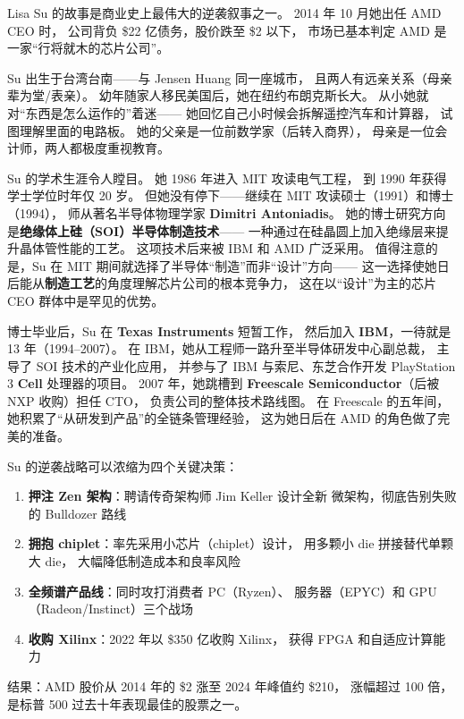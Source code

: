 Lisa Su 的故事是商业史上最伟大的逆袭叙事之一。
2014 年 10 月她出任 AMD CEO 时，
公司背负 \$22 亿债务，股价跌至 \$2 以下，
市场已基本判定 AMD 是一家``行将就木的芯片公司''。

Su 出生于台湾台南——与 Jensen Huang 同一座城市，
且两人有远亲关系（母亲辈为堂/表亲）。
幼年随家人移民美国后，她在纽约布朗克斯长大。
从小她就对``东西是怎么运作的''着迷——
她回忆自己小时候会拆解遥控汽车和计算器，
试图理解里面的电路板。
她的父亲是一位前数学家（后转入商界），
母亲是一位会计师，两人都极度重视教育。

\begin{corebox}
Su 的学术生涯令人瞠目。
她 1986 年进入 MIT 攻读电气工程，
到 1990 年获得学士学位时年仅 20 岁。
但她没有停下——继续在 MIT 攻读硕士（1991）和博士（1994），
师从著名半导体物理学家 \textbf{Dimitri Antoniadis}。
她的博士研究方向是\textbf{绝缘体上硅（SOI）半导体制造技术}——
一种通过在硅晶圆上加入绝缘层来提升晶体管性能的工艺。
这项技术后来被 IBM 和 AMD 广泛采用。
值得注意的是，Su 在 MIT 期间就选择了半导体``制造''而非``设计''方向——
这一选择使她日后能从\textbf{制造工艺}的角度理解芯片公司的根本竞争力，
这在以``设计''为主的芯片 CEO 群体中是罕见的优势。
\end{corebox}

博士毕业后，Su 在 \textbf{Texas Instruments} 短暂工作，
然后加入 \textbf{IBM}，一待就是 13 年（1994--2007）。
在 IBM，她从工程师一路升至半导体研发中心副总裁，
主导了 SOI 技术的产业化应用，
并参与了 IBM 与索尼、东芝合作开发 PlayStation 3 \textbf{Cell} 处理器的项目。
2007 年，她跳槽到 \textbf{Freescale Semiconductor}（后被 NXP 收购）担任 CTO，
负责公司的整体技术路线图。
在 Freescale 的五年间，她积累了``从研发到产品''的全链条管理经验，
这为她日后在 AMD 的角色做了完美的准备。

\begin{whybox}
Su 的逆袭战略可以浓缩为四个关键决策：
\begin{enumerate}[noitemsep]
  \item \textbf{押注 Zen 架构}：聘请传奇架构师 Jim Keller 设计全新
        微架构，彻底告别失败的 Bulldozer 路线
  \item \textbf{拥抱 chiplet}：率先采用小芯片（chiplet）设计，
        用多颗小 die 拼接替代单颗大 die，
        大幅降低制造成本和良率风险
  \item \textbf{全频谱产品线}：同时攻打消费者 PC（Ryzen）、
        服务器（EPYC）和 GPU（Radeon/Instinct）三个战场
  \item \textbf{收购 Xilinx}：2022 年以 \$350 亿收购 Xilinx，
        获得 FPGA 和自适应计算能力
\end{enumerate}
结果：AMD 股价从 2014 年的 \$2 涨至 2024 年峰值约 \$210，
涨幅超过 100 倍，是标普 500 过去十年表现最佳的股票之一。
\end{whybox}

